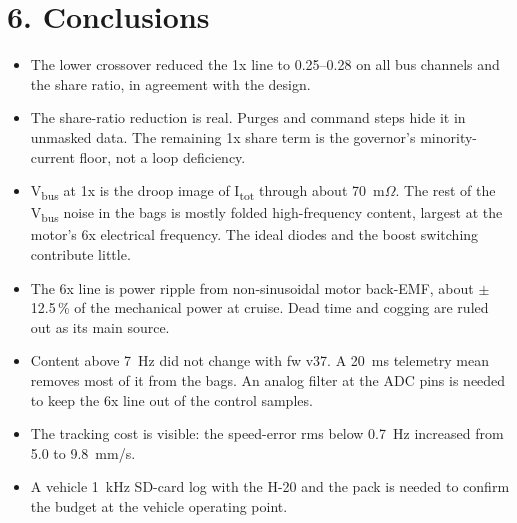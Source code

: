 \documentclass[10pt]{article}
\newcommand{\Itot}{I\textsubscript{tot}}
\newcommand{\Vbus}{V\textsubscript{bus}}
\begin{document}
\section*{6. Conclusions}
\begin{itemize}\setlength{\itemsep}{0pt}
\item The lower crossover reduced the 1x line to 0.25--0.28 on all bus channels and the share
ratio, in agreement with the design.
\item The share-ratio reduction is real. Purges and command steps hide it in unmasked data. The
remaining 1x share term is the governor's minority-current floor, not a loop deficiency.
\item \Vbus{} at 1x is the droop image of \Itot{} through about 70~m$\Omega$. The rest of the
\Vbus{} noise in the bags is mostly folded high-frequency content, largest at the motor's 6x
electrical frequency. The ideal diodes and the boost switching contribute little.
\item The 6x line is power ripple from non-sinusoidal motor back-EMF, about $\pm$12.5\,\% of the
mechanical power at cruise. Dead time and cogging are ruled out as its main source.
\item Content above 7~Hz did not change with fw v37. A 20~ms telemetry mean removes most of it from
the bags. An analog filter at the ADC pins is needed to keep the 6x line out of the control
samples.
\item The tracking cost is visible: the speed-error rms below 0.7~Hz increased from 5.0 to
9.8~mm/s.
\item A vehicle 1~kHz SD-card log with the H-20 and the pack is needed to confirm the budget at
the vehicle operating point.
\end{itemize}
\end{document}
